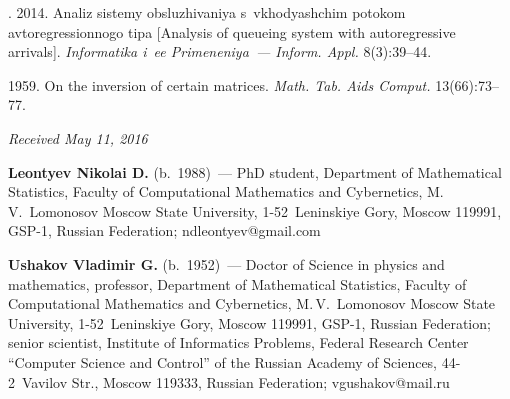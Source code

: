   \begin{multicols}{2}

\renewcommand{\bibname}{\protect\rmfamily References}

{\small\frenchspacing
 {%
 \begin{thebibliography}{9}
. 
2014. Analiz sistemy obsluzhivaniya s~vkhodyashchim potokom avtoregressionnogo tipa 
[Analysis of queueing system with autoregressive arrivals]. 
\textit{Informatika i~ee Primeneniya~--- Inform. Appl.} 8(3):39--44.

 
 1959. On the inversion of certain matrices. 
\textit{Math. Tab. Aids Comput.} 13(66):73--77.
   \end{thebibliography}

 }
 }

\end{multicols}

\vspace*{-3pt}

\hfill{\small\textit{Received May 11, 2016}}


\Contr

\noindent
\textbf{Leontyev Nikolai D.} (b.\ 1988)~--- PhD student,
Department of Mathematical 
Statistics, Faculty of Computational Mathematics and Cybernetics, M.\,V.~Lomonosov 
Moscow State University, 1-52~Leninskiye Gory, Moscow 119991, GSP-1, Russian 
Federation; \mbox{ndleontyev@gmail.com}

\vspace*{3pt}

\noindent
\textbf{Ushakov Vladimir G.} (b.\ 1952)~---
Doctor of Science in physics and mathematics, professor, Department of Mathematical 
Statistics, Faculty of Computational Mathematics and Cybernetics, M.\,V.~Lomonosov 
Moscow State University, 1-52~Leninskiye Gory, Moscow 119991, GSP-1, Russian 
Federation; senior scientist, Institute of Informatics Problems, Federal 
Research Center ``Computer Science and Control'' of the Russian Academy of Sciences, 
44-2~Vavilov Str., Moscow 119333, Russian Federation; \mbox{vgushakov@mail.ru} 
\label{end\stat}


\renewcommand{\bibname}{\protect\rm Литература}